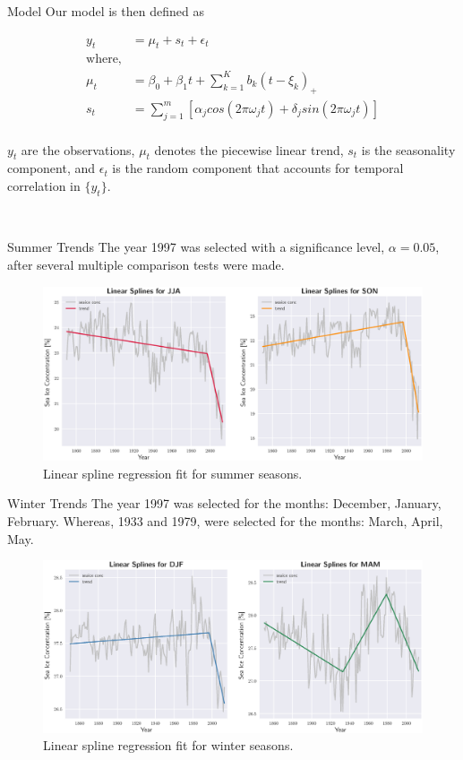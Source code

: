 \documentclass[10pt]{beamer}
\begin{document}
\begin{frame}{Model}
Our model is then defined as

\setlength{\abovedisplayskip}{0pt}
\setlength{\belowdisplayskip}{0pt}
\begin{align*}
y_t &= \mu_t + s_t + \epsilon_t \\
\text{where,} \\
\mu_t &= \beta_0 + \beta_{1}t + \sum_{k=1}^{K}b_{k}(t-\xi_k)_{+} \\
s_t &= \sum_{j=1}^{m}[\alpha_{j}cos(2\pi\omega_{j}t) + \delta_{j}sin(2\pi\omega_{j}t)] \\
\end{align*}

$y_t$ are the observations, $\mu_t$ denotes the piecewise linear trend, $s_t$ is the seasonality component, and $\epsilon_t$ is the random component that accounts for temporal correlation in $\{y_t\}$.

\\

\end{frame}

\begin{frame}{Summer Trends}
The year 1997 was selected with a significance level, $\alpha=0.05$, after several multiple comparison tests were made.
	\begin{figure}[htbp]
		\centering
		\includegraphics[scale=0.37]{summer_splines}
		\caption{Linear spline regression fit for summer seasons.}
	\end{figure}
\end{frame}

\begin{frame}{Winter Trends}
The year 1997 was selected for the months: December, January, February. Whereas, 1933 and 1979, were selected for the months: March, April, May.
	\begin{figure}[htbp]
		\centering
		\includegraphics[scale=0.37]{winter_splines}
		\caption{Linear spline regression fit for winter seasons.}
	\end{figure}
\end{frame}
\end{document}
